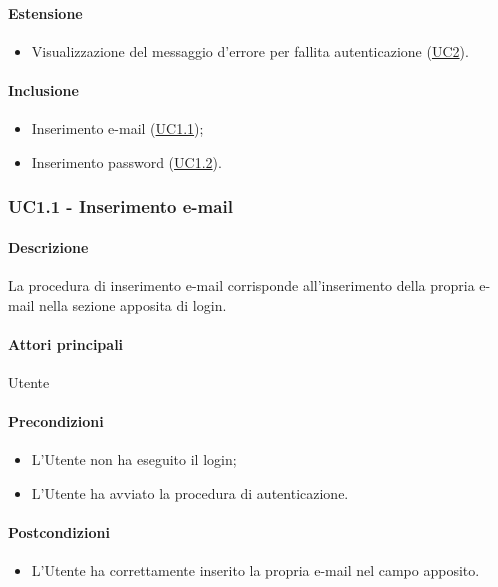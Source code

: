\paragraph*{Estensione}
\begin{itemize}
  \item Visualizzazione del messaggio d’errore per fallita autenticazione (\hyperref[UC2]{UC2}).
\end{itemize}

\paragraph*{Inclusione}
\begin{itemize}
  \item Inserimento e-mail (\hyperref[UC1point1]{UC1.1});
  \item Inserimento password (\hyperref[UC1point2]{UC1.2}).
\end{itemize}


\subsubsection{UC1.1 - Inserimento e-mail}\label{UC1point1}
\paragraph*{Descrizione}
La procedura di inserimento e-mail corrisponde all’inserimento della propria e-mail nella sezione apposita di login.

\paragraph*{Attori principali}
Utente

\paragraph*{Precondizioni}
\begin{itemize}
  \item L’Utente non ha eseguito il login;
  \item L’Utente ha avviato la procedura di autenticazione.  
\end{itemize}

\paragraph*{Postcondizioni}
\begin{itemize}
  \item L’Utente ha correttamente inserito la propria e-mail nel campo apposito.
\end{itemize}

